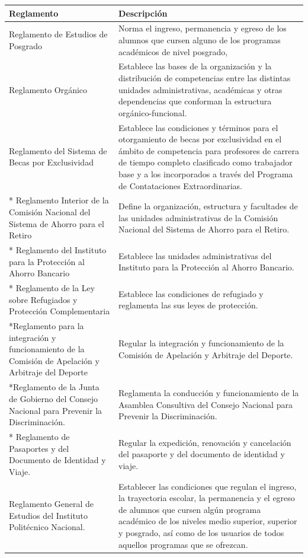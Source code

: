 \begin{tabular}{ | m{17em} | m{25em}|}
    \hline
    \textbf{Reglamento} & \textbf{Descripción} \\
    \hline
    Reglamento de Estudios de Posgrado & Norma el ingreso, permanencia y egreso de los alumnos que cursen alguno de los programas académicos  de  nivel  posgrado, \\
    \hline
    Reglamento Orgánico & Establece  las  bases  de la organización y la distribución de competencias entre las distintas unidades administrativas, académicas y otras dependencias que conforman la estructura orgánico-funcional. \\
    \hline
    Reglamento del Sistema de Becas por Exclusividad & Establece las condiciones y términos para el otorgamiento de becas por exclusividad en el ámbito de competencia para profesores de carrera de tiempo completo clasificado como trabajador base y a los incorporados a través del Programa de Contataciones Extraordinarias. \\
    \hline
    * Reglamento Interior de la Comisión Nacional del Sistema de Ahorro para el Retiro & Define la organización, estructura y facultades de las unidades administrativas de la Comisión Nacional  del  Sistema  de  Ahorro  para  el  Retiro.\\
    \hline
    * Reglamento del Instituto para la Protección al Ahorro Bancario & Establece las unidades administrativas del Instituto para la Protección al Ahorro Bancario. \\
    \hline
    * Reglamento de la Ley sobre Refugiados y Protección Complementaria & Establece las condiciones de refugiado y reglamenta las sus leyes de protección. \\
    \hline
    *Reglamento para la integración y funcionamiento de la Comisión de Apelación y Arbitraje del Deporte & Regular la integración y funcionamiento de la Comisión de Apelación y Arbitraje del Deporte. \\
    \hline
    *Reglamento de la Junta de Gobierno del Consejo Nacional para Prevenir la Discriminación. & Reglamenta la conducción y funcionamiento de la Asamblea Consultiva del Consejo Nacional para Prevenir la Discriminación. \\
    \hline
    * Reglamento de Pasaportes y del Documento de Identidad y Viaje. & Regular la expedición, renovación y cancelación del pasaporte y del documento de identidad y viaje. \\
    \hline
    Reglamento General de Estudios del Instituto Politécnico Nacional. & Establecer las condiciones que regulan el ingreso, la trayectoria escolar, la permanencia y el egreso de alumnos que cursen algún programa académico de los niveles medio superior, superior y posgrado, así como de los usuarios de todos aquellos programas que se ofrezcan.  \\

\end{tabular}
